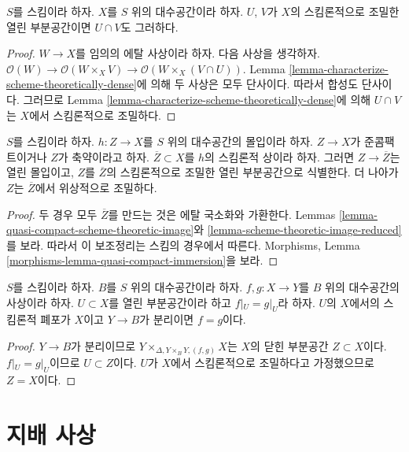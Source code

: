 \begin{lemma}
\label{lemma-intersection-scheme-theoretically-dense}
$S$를 스킴이라 하자. $X$를 $S$ 위의 대수공간이라 하자.
$U$, $V$가 $X$의 스킴론적으로 조밀한 열린 부분공간이면
$U \cap V$도 그러하다.
\end{lemma}

\begin{proof}
$W \to X$를 임의의 에탈 사상이라 하자. 다음 사상을 생각하자.
$\mathcal{O}(W) \to \mathcal{O}(W \times_X V)
\to \mathcal{O}(W \times_X (V \cap U))$.
Lemma \ref{lemma-characterize-scheme-theoretically-dense}에 의해
두 사상은 모두 단사이다. 따라서 합성도 단사이다.
그러므로 Lemma \ref{lemma-characterize-scheme-theoretically-dense}에 의해
$U \cap V$는 $X$에서
스킴론적으로 조밀하다.
\end{proof}

\begin{lemma}
\label{lemma-quasi-compact-immersion}
$S$를 스킴이라 하자. $h : Z \to X$를 $S$ 위의 대수공간의
몰입이라 하자. $Z \to X$가 준콤팩트이거나 $Z$가 축약이라고 하자.
$\overline{Z} \subset X$를 $h$의 스킴론적 상이라 하자.
그러면 $Z \to \overline{Z}$는 열린 몰입이고, $Z$를
$\overline{Z}$의 스킴론적으로 조밀한 열린 부분공간으로 식별한다.
더 나아가 $Z$는 $\overline{Z}$에서 위상적으로 조밀하다.
\end{lemma}

\begin{proof}
두 경우 모두 $\overline{Z}$를 만드는 것은 에탈 국소화와 가환한다.
Lemmas \ref{lemma-quasi-compact-scheme-theoretic-image}와
\ref{lemma-scheme-theoretic-image-reduced}를 보라.
따라서 이 보조정리는 스킴의 경우에서 따른다.
Morphisms, Lemma \ref{morphisms-lemma-quasi-compact-immersion}을 보라.
\end{proof}

\begin{lemma}
\label{lemma-equality-of-morphisms}
$S$를 스킴이라 하자. $B$를 $S$ 위의 대수공간이라 하자.
$f, g : X \to Y$를 $B$ 위의 대수공간의 사상이라 하자.
$U \subset X$를 열린 부분공간이라 하고 $f|_U = g|_U$라 하자.
$U$의 $X$에서의 스킴론적 폐포가 $X$이고 $Y \to B$가 분리이면
$f = g$이다.
\end{lemma}

\begin{proof}
$Y \to B$가 분리이므로
$Y \times_{\Delta, Y \times_B Y, (f, g)} X$는 $X$의 닫힌
부분공간 $Z \subset X$이다. $f|_U = g|_U$이므로 $U \subset Z$이다.
$U$가 $X$에서 스킴론적으로 조밀하다고 가정했으므로 $Z = X$이다.
\end{proof}
\section{지배 사상}
\label{section-dominant}

